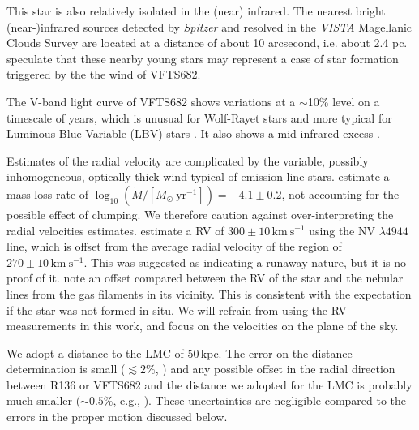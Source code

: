 \documentclass[a4paper,fleqn,usenatbib]{mnras}
\newcommand{\kms}{{\,\mathrm{km\ s^{-1}}}}
\begin{document}
This star is also relatively isolated in the (near)
infrared. The nearest bright (near-)infrared sources detected by
\emph{Spitzer} \citep{meixner:06} and resolved in the \emph{VISTA}
Magellanic Clouds Survey \citep{cioni:11} are located at a distance of
about 10 arcsecond, i.e. about 2.4 pc. \cite{walborn:13} speculate
that these nearby young stars may represent a case of star formation triggered by the the wind of VFTS682.

The V-band light curve of VFTS682  shows
variations at a $\sim$10\% level on a timescale of years, which is
unusual for Wolf-Rayet stars and more typical for Luminous Blue
Variable (LBV) stars \citep{udalski:08, bestenlehner:11}. It also
shows a mid-infrared excess \citep{gruendl:09}.

Estimates of the radial velocity are complicated by the variable,
possibly inhomogeneous, optically thick wind  typical of emission line
stars. \citet{bestenlehner:11} estimate a mass loss rate of
$\log_{10}(\dot{M}/[M_\odot \ \mathrm{yr}^{-1}])=-4.1\pm0.2$, not accounting for the
possible effect of clumping.  We therefore caution
against over-interpreting the radial velocities estimates. %
\citet{bestenlehner:11}  estimate a RV of
$300\pm10\kms$ using the  N{\footnotesize V} $\lambda4944$ line, which
is offset from the average radial velocity of the region of
$270\pm10\kms$. This was suggested as indicating a runaway nature, but
it is no proof of it. %
\cite{bressert:12} note an offset compared between the RV of
the star and the nebular lines from the gas filaments in its
vicinity. This is consistent with the expectation if the star was not
formed in situ. We will refrain from using the RV measurements in this
work, and focus on the velocities on the plane of the sky. 

We adopt a distance to the LMC of $50$\,kpc. The error on
the distance determination is small ($\lesssim2\%$,
\citealt{pietrzynski:13}) and any possible offset in the radial
direction between R136 or VFTS682 and the distance we adopted for the
LMC is probably much smaller ($\sim$$0.5\%$, e.g., \citealt{luks:92}). These uncertainties are negligible compared to the errors in the proper motion discussed below.  
\end{document}
